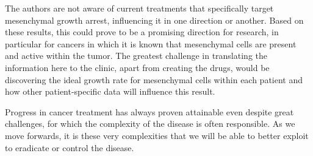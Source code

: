 \documentclass[11pt, a4paper, preprint]{article}
\begin{document}
The authors are not aware of current treatments that specifically target mesenchymal growth arrest, influencing it in one direction or another.
%
Based on these results, this could prove to be a promising direction for research, in particular for cancers in which it is known that mesenchymal cells are present and active within the tumor.
The greatest challenge in translating the information here to the clinic, apart from creating the drugs, would be discovering the ideal growth rate for mesenchymal cells within each patient and how other patient-specific data will influence this result.

Progress in cancer treatment has always proven attainable even despite great challenges, for which the complexity of the disease is often responsible. As we move forwards, it is these very complexities that we will be able to better exploit to eradicate or control the disease.


{}

\end{document}
